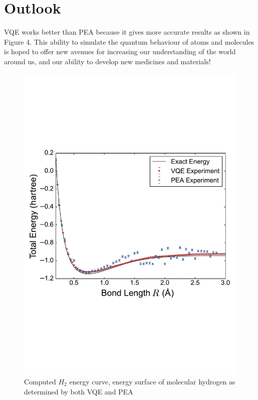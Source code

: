 \documentclass[14pt,landscape,color=UCLdarkred,margin=3cm]{uclposter}
\begin{document}
\begin{multicols}{3}
\begin{figure}[H]
   
\end{figure}



\section*{Outlook}

VQE works better than PEA because it gives more accurate results as shown in Figure 4. This ability to simulate the quantum behaviour of atoms and molecules is hoped to offer new avenues for increasing our understanding of the world around us, and our ability to develop new medicines and materials!

\begin{figure}[H]
  \begin{center}
  \includegraphics[scale=1.35]{result.pdf}
  \caption{Computed $H_2$ energy curve, energy surface of molecular hydrogen as determined by both VQE and PEA}
  \end{center}
    
 

   
\end{figure}



\end{multicols}
	
\end{document}
